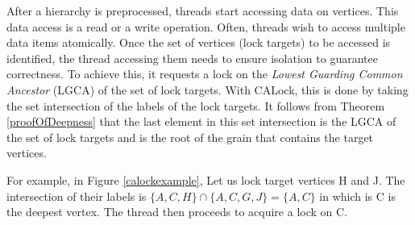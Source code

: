 After a hierarchy is preprocessed, threads start accessing data on vertices. This data access is a read or a write operation. Often, threads wish to access multiple data items atomically. Once the set of vertices (lock targets) to be accessed  is identified, the thread accessing them needs to ensure isolation to guarantee correctness. To achieve this, it requests a lock on the \emph{Lowest Guarding Common Ancestor} (LGCA) of the set of lock targets. With CALock, this is done by taking the set intersection of the labels of the lock targets. It follows from Theorem \ref{proofOfDeepness} that the last element in this set intersection is the LGCA of the set of lock targets and is the root of the grain that contains the target vertices. 

For example, in Figure \ref{calockexample}, Let us lock target vertices H and J. The intersection of their labels is $\{A, C, H\} \cap \{A, C, G, J\} =  \{A,C\}$ in which is C is the deepest vertex. The thread then proceeds to acquire a lock on C. 





